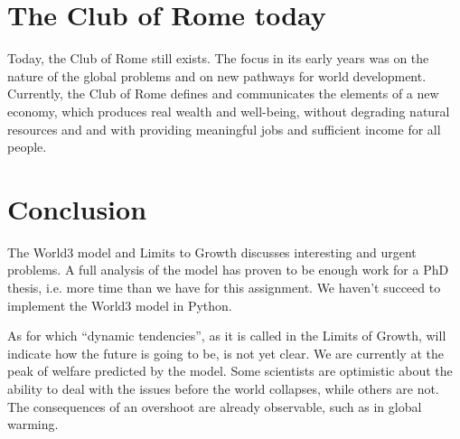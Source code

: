 \documentclass[10pt,a4paper]{scrartcl}
\begin{document}
\section*{The Club of Rome today}

Today, the Club of Rome still exists. The focus in its early years was on the nature of the global problems and on new pathways for world development. Currently, the Club of Rome defines and communicates the elements of a new economy, which produces real wealth and well-being, without degrading natural resources and and with providing meaningful jobs and sufficient income for all people.

\section*{Conclusion}

The World3 model and Limits to Growth discusses interesting and urgent problems. A full analysis of the model has proven to be enough work for a PhD thesis, i.e. more time than we have for this assignment. We haven't succeed to implement the World3 model in Python.

As for which ``dynamic tendencies'', as it is called in the Limits of Growth, will indicate how the future is going to be, is not yet clear. We are currently at the peak of welfare predicted by the model. Some scientists are optimistic about the ability to deal with the issues before the world collapses, while others are not. The consequences of an overshoot are already observable, such as in global warming.


\nocite{*}

\end{document}
